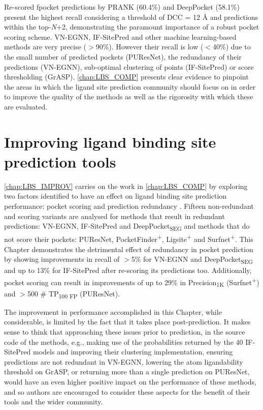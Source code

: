 Re-scored fpocket predictions by PRANK (60.4\%) and DeepPocket (58.1\%) present the highest recall considering a threshold of DCC = 12 \AA{} and predictions within the top-\textit{N}+2, demonstrating the paramount importance of a robust pocket scoring scheme. VN-EGNN, IF-SitePred and other machine learning-based methods are very precise ($>$90\%). However their recall is low ($<$40\%) due to the small number of predicted pockets (PUResNet), the redundancy of their predictions (VN-EGNN), sub-optimal clustering of points (IF-SitePred) or score thresholding (GrASP). \autoref{chap:LBS_COMP} presents clear evidence to pinpoint the areas in which the ligand site prediction community should focus on in order to improve the quality of the methods as well as the rigorosity with which these are evaluated.

\section{Improving ligand binding site prediction tools}

\autoref{chap:LBS_IMPROV} carries on the work in \autoref{chap:LBS_COMP} by exploring two factors identified to have an effect on ligand binding site prediction performance: pocket scoring and prediction redundancy \cite{UTGES_2024_LBSCOMP}. Fifteen non-redundant and scoring variants are analysed for methods that result in redundant predictions: VN-EGNN, IF-SitePred and DeepPocket\textsubscript{SEG} and methods that do not score their pockets: PUResNet, PocketFinder\textsuperscript{+}, Ligsite\textsuperscript{+} and Surfnet\textsuperscript{+}. This Chapter demonstrates the detrimental effect of redundancy in pocket prediction by showing improvements in recall of $>$5\% for VN-EGNN and DeepPocket\textsubscript{SEG} and up to 13\% for IF-SitePred after re-scoring its predictions too. Additionally, pocket scoring can result in improvements of up to 29\% in Precision\textsubscript{1K} (Surfnet\textsuperscript{+}) and $>$500 \# TP\textsubscript{100 FP} (PUResNet).

The improvement in performance accomplished in this Chapter, while considerable, is limited by the fact that it takes place post-prediction. It makes sense to think that approaching these issues prior to prediction, in the source code of the methods, e.g., making use of the probabilities returned by the 40 IF-SitePred models and improving their clustering implementation, ensuring predictions are not redundant in VN-EGNN, lowering the atom ligandability threshold on GrASP, or returning more than a single prediction on PUResNet, would have an even higher positive impact on the performance of these methods, and so authors are encouraged to consider these aspects for the benefit of their tools and the wider community.

